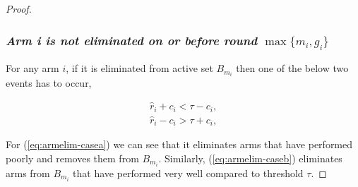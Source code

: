 \begin{proof}
\subsubsection{\textit{Arm i is not eliminated on or before round $\max\lbrace m_{i},g_{i}\rbrace$}}



For any arm $i$, if it is eliminated from active set $B_{m_{i}}$ then one of the below two events has to occur,
\begin{small}
\begin{align}
\hat{r}_{i} + c_{i} < \tau - c_{i}, \label{eq:armelim-casea}\\
\hat{r}_{i} - c_{i} > \tau + c_{i}, \label{eq:armelim-caseb}
\end{align}
\end{small}
For (\ref{eq:armelim-casea}) we can see that it eliminates arms that have performed poorly and removes them  from $B_{m_{i}}$. Similarly, (\ref{eq:armelim-caseb}) eliminates arms from $B_{m_{i}}$ that have performed very well compared to threshold $\tau$.


\end{proof}

